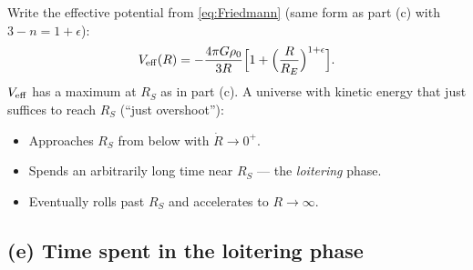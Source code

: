 \documentclass[11pt]{article}
\begin{document}
Write the effective potential from \eqref{eq:Friedmann} (same form as part (c) with $3-n=1+\epsilon$):
\[
V_{\rm eff}(R)=-\frac{4\pi G\rho_{0}}{3R}\Bigl[1+\Bigl(\frac{R}{R_{E}}\Bigr)^{1+\epsilon}\Bigr].
\]
$V_{\rm eff}$ has a maximum at $R_{S}$ as in part (c).  A universe with kinetic energy that just suffices to reach $R_{S}$ (``just overshoot''):
\begin{itemize}
\item Approaches $R_{S}$ from below with $\dot R\to 0^{+}$.
\item Spends an arbitrarily long time near $R_{S}$ — the \emph{loitering} phase.
\item Eventually rolls past $R_{S}$ and accelerates to $R\to\infty$.
\end{itemize}

\subsection*{(e) Time spent in the loitering phase}
\end{document}
